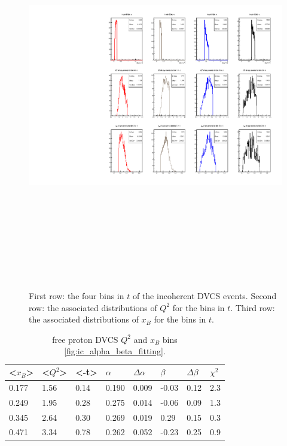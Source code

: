 \begin{figure}[h!]
   \centering
   \includegraphics[height=17.0cm]{4D-incoh-bin/4D-t_InCoh_bins.pdf}
   \caption{ First row: the four bins in $t$ of the incoherent DVCS events.  
   Second row: the associated distributions of $Q^2$ for the bins in $t$.  
   Third row: the associated distributions of $x_B$ for the bins in $t$.}
\label{fig:incoh_xB-bins-freep}
\end{figure}




\begin {table}[!h]
\begin{center}
\begin{tabular}{|l|l|l|l|l|l|l|l|}
\hline
<$x_{B}$> & <$Q^2$> & <-t> & $\alpha$ & $\Delta \alpha$ &  $\beta$ & $\Delta 
   \beta$ & $\chi^{2}$\\
\hline
0.177 & 1.56 & 0.14 & 0.190 & 0.009 & -0.03 & 0.12  & 2.3\\
\hline
0.249 & 1.95 & 0.28 & 0.275 & 0.014 & -0.06 & 0.09  & 1.3\\
\hline
0.345 & 2.64 & 0.30 & 0.269 & 0.019 & 0.29 & 0.15  & 0.3\\
\hline
0.471 & 3.34 & 0.78 & 0.262 & 0.052 & -0.23 & 0.25  & 0.9\\
\hline
\end{tabular}
   \caption{free proton DVCS $Q^{2}$ and $x_{B}$ bins
   \ref{fig:ic_alpha_beta_fitting}.}
\label{Table:freeproton-x_Q2_bins}
\end{center}
\end{table}



